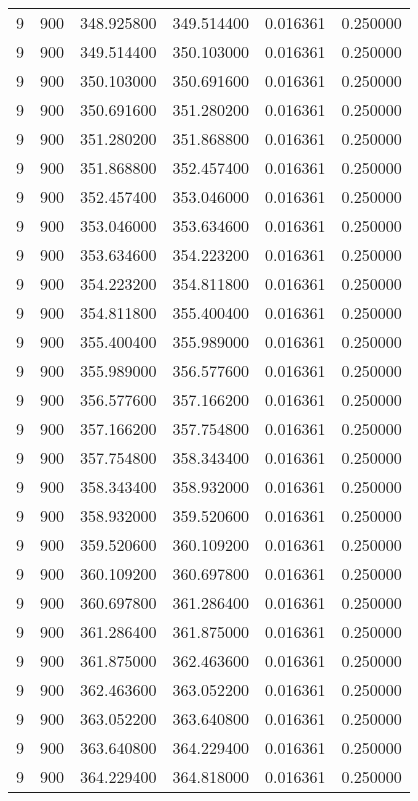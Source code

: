 \begin{longtable}{rrrrrr}
9 & 900 & 348.925800 & 349.514400 & 0.016361 & 0.250000 \\
9 & 900 & 349.514400 & 350.103000 & 0.016361 & 0.250000 \\
9 & 900 & 350.103000 & 350.691600 & 0.016361 & 0.250000 \\
9 & 900 & 350.691600 & 351.280200 & 0.016361 & 0.250000 \\
9 & 900 & 351.280200 & 351.868800 & 0.016361 & 0.250000 \\
9 & 900 & 351.868800 & 352.457400 & 0.016361 & 0.250000 \\
9 & 900 & 352.457400 & 353.046000 & 0.016361 & 0.250000 \\
9 & 900 & 353.046000 & 353.634600 & 0.016361 & 0.250000 \\
9 & 900 & 353.634600 & 354.223200 & 0.016361 & 0.250000 \\
9 & 900 & 354.223200 & 354.811800 & 0.016361 & 0.250000 \\
9 & 900 & 354.811800 & 355.400400 & 0.016361 & 0.250000 \\
9 & 900 & 355.400400 & 355.989000 & 0.016361 & 0.250000 \\
9 & 900 & 355.989000 & 356.577600 & 0.016361 & 0.250000 \\
9 & 900 & 356.577600 & 357.166200 & 0.016361 & 0.250000 \\
9 & 900 & 357.166200 & 357.754800 & 0.016361 & 0.250000 \\
9 & 900 & 357.754800 & 358.343400 & 0.016361 & 0.250000 \\
9 & 900 & 358.343400 & 358.932000 & 0.016361 & 0.250000 \\
9 & 900 & 358.932000 & 359.520600 & 0.016361 & 0.250000 \\
9 & 900 & 359.520600 & 360.109200 & 0.016361 & 0.250000 \\
9 & 900 & 360.109200 & 360.697800 & 0.016361 & 0.250000 \\
9 & 900 & 360.697800 & 361.286400 & 0.016361 & 0.250000 \\
9 & 900 & 361.286400 & 361.875000 & 0.016361 & 0.250000 \\
9 & 900 & 361.875000 & 362.463600 & 0.016361 & 0.250000 \\
9 & 900 & 362.463600 & 363.052200 & 0.016361 & 0.250000 \\
9 & 900 & 363.052200 & 363.640800 & 0.016361 & 0.250000 \\
9 & 900 & 363.640800 & 364.229400 & 0.016361 & 0.250000 \\
9 & 900 & 364.229400 & 364.818000 & 0.016361 & 0.250000 \\

\end{longtable}
